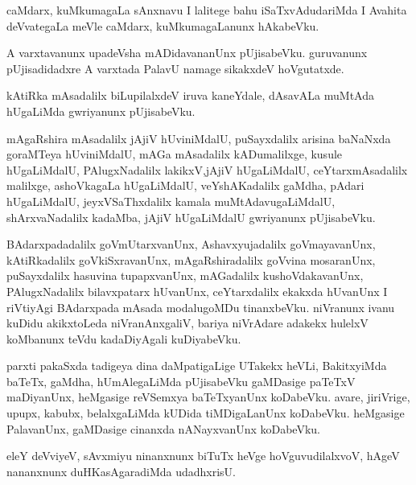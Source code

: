 \documentclass{article}
\begin{document}
\begin{mn}
caMdarx,  kuMkumagaLa  sAnxnavu  I  lalitege  bahu  iSaTxvAdudariMda  I  Avahita  deVvategaLa  meVle  caMdarx,  
kuMkumagaLanunx  hAkabeVku. 
\end{mn}

\begin{mn}
A  varxtavanunx  upadeVsha  mADidavananUnx  pUjisabeVku.  guruvanunx  pUjisadidadxre  A  varxtada  PalavU  namage  
sikakxdeV  hoVgutatxde. 
\end{mn}

\begin{mn}
kAtiRka  mAsadalilx  biLupilalxdeV  iruva  kaneYdale,  dAsavALa  muMtAda  hUgaLiMda  gwriyanunx  pUjisabeVku.
\end{mn}

\begin{mn}
mAgaRshira  mAsadalilx  jAjiV  hUviniMdalU,  puSayxdalilx  arisina  baNaNxda  goraMTeya  hUviniMdalU,  mAGa  
mAsadalilx  kADumalilxge,  kusule  hUgaLiMdalU,  PAlugxNadalilx  lakikxV,jAjiV  hUgaLiMdalU,  ceYtarxmAsadalilx  
malilxge,  ashoVkagaLa  hUgaLiMdalU,  veYshAKadalilx  gaMdha,  pAdari  hUgaLiMdalU,  jeyxVSaThxdalilx  kamala  
muMtAdavugaLiMdalU,  shArxvaNadalilx  kadaMba,  jAjiV  hUgaLiMdalU  gwriyanunx  pUjisabeVku.
\end{mn}

\begin{mn}
BAdarxpadadalilx  goVmUtarxvanUnx,  Ashavxyujadalilx  goVmayavanUnx,  kAtiRkadalilx  goVkiSxravanUnx,  
mAgaRshiradalilx  goVvina  mosaranUnx,  puSayxdalilx  hasuvina  tupapxvanUnx,  mAGadalilx  
kushoVdakavanUnx,  PAlugxNadalilx  bilavxpatarx  hUvanUnx,  ceYtarxdalilx  ekakxda  hUvanUnx  
I  riVtiyAgi  BAdarxpada  mAsada  modalugoMDu  tinanxbeVku.  niVranunx  ivanu  kuDidu  akikxtoLeda  
niVranAnxgaliV,  bariya  niVrAdare  adakekx  hulelxV  koMbanunx  teVdu  kadaDiyAgali  kuDiyabeVku.
\end{mn}

\begin{mn}
parxti  pakaSxda  tadigeya  dina  daMpatigaLige  UTakekx  heVLi,  BakitxyiMda  baTeTx,  gaMdha,  
hUmAlegaLiMda  pUjisabeVku  gaMDasige  paTeTxV  maDiyanUnx,  heMgasige  reVSemxya  baTeTxyanUnx  
koDabeVku.  avare,  jiriVrige, upupx,  kabubx,  belalxgaLiMda  kUDida  tiMDigaLanUnx  koDabeVku.  
heMgasige  PalavanUnx,  gaMDasige  cinanxda  nANayxvanUnx  koDabeVku.
\end{mn}

\begin{mn}
eleY  deVviyeV,  sAvxmiyu  ninanxnunx  biTuTx  heVge  hoVguvudilalxvoV,  hAgeV  nananxnunx  
duHKasAgaradiMda  udadhxrisU.
\end{mn}
\end{document}
